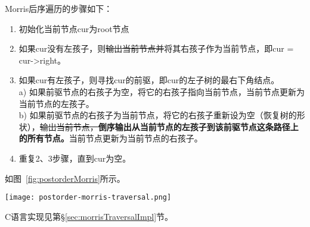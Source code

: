 Morris后序遍历的步骤如下：
\begin{enumerate}
\item 初始化当前节点cur为root节点
\item 如果cur没有左孩子，则\sout{输出当前节点并}将其右孩子作为当前节点，即cur = cur->right。
\item 如果cur有左孩子，则寻找cur的前驱，即cur的左子树的最右下角结点。\\
   a) 如果前驱节点的右孩子为空，将它的右孩子指向当前节点，当前节点更新为当前节点的左孩子。\\
   b) 如果前驱节点的右孩子为当前节点，将它的右孩子重新设为空（恢复树的形状），\sout{输出当前节点，}\textbf{倒序输出从当前节点的左孩子到该前驱节点这条路径上的所有节点。}当前节点更新为当前节点的右孩子。
\item 重复2、3步骤，直到cur为空。
\end{enumerate}
如图~\ref{fig:postorderMorris}所示。

\begin{center}
\texttt{[image: postorder-morris-traversal.png]} \\
\label{fig:postorderMorris}
\end{center}

C语言实现见第\S\ref{sec:morrisTraversalImpl}节。


